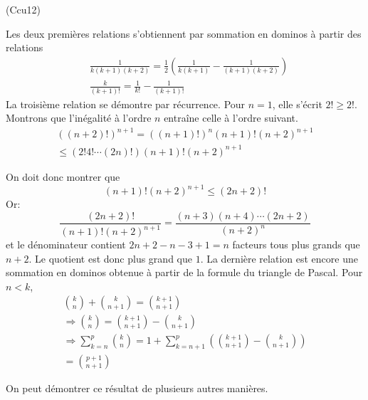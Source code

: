 \begin{tiny}(Ccu12)\end{tiny} Les deux premières relations s'obtiennent par sommation en dominos à partir des relations
\begin{align*}
  &\frac{1}{k(k+1)(k+2)} = \frac{1}{2}\left( \frac{1}{k(k+1)} - \frac{1}{(k+1)(k+2)}\right) \\
  &\frac{k}{(k+1)!} = \frac{1}{k!} - \frac{1}{(k+1)!}
\end{align*}
La troisième relation se démontre par récurrence.\newline
Pour $n=1$, elle s'écrit $2! \geq 2!$.\newline
Montrons que l'inégalité à l'ordre $n$ entraîne celle à l'ordre suivant.
\begin{multline*}
  ((n+2)!)^{n+1} = ((n+1)!)^{n}(n+1)!(n+2)^{n+1} \\
  \leq \left( 2!4!\cdots (2n)!\right)(n+1)!(n+2)^{n+1} 
\end{multline*}

On doit donc montrer que 
\begin{displaymath}
  (n+1)!(n+2)^{n+1} \leq (2n+2)!
\end{displaymath}
Or:
\begin{displaymath}
  \frac{(2n+2)!}{(n+1)!(n+2)^{n+1}} = \frac{(n+3)(n+4)\cdots (2n+2)}{(n+2)^{n}}
\end{displaymath}
et le dénominateur contient $2n+2-n-3+1=n$ facteurs tous plus grands que $n+2$. Le quotient est donc plus grand que $1$.\newline
La dernière relation est encore une sommation en dominos obtenue à partir de la formule du triangle de Pascal. Pour $n<k$,
\begin{multline*}
\binom{k}{n} + \binom{k}{n+1} = \binom{k+1}{n+1} \\
\Rightarrow \binom{k}{n} = \binom{k+1}{n+1} - \binom{k}{n+1} \\
\Rightarrow
\sum_{k=n}^p \binom{k}{n} = 1 + \sum_{k=n+1}^p\left( \binom{k+1}{n+1} - \binom{k}{n+1}\right)\\
= \binom{p+1}{n+1}
\end{multline*}

On peut démontrer ce résultat de plusieurs autres manières.

